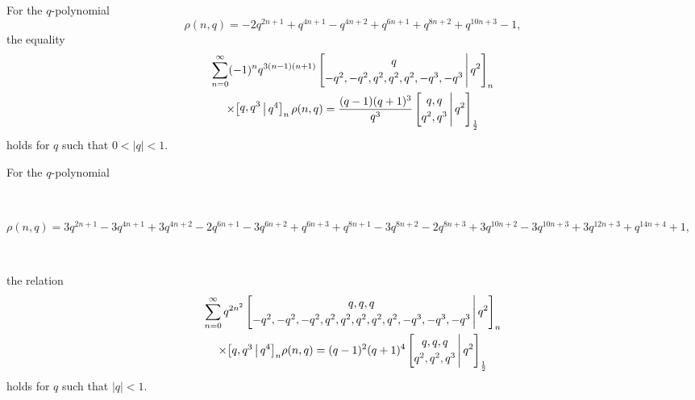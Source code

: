 \documentclass[10pt,a4paper]{amsart}
\begin{document}
\begin{theorem}\label{qnegquarttheorem}
 For the $q$-polynomial 
 $$\rho(n, q) = -2 q^{2 n+1}+q^{4 n+1}-q^{4 n+2}+q^{6 n+1}+q^{8 n+2}+q^{10 n+3}-1,$$ 
\noindent the equality 
\begin{multline*}
 \sum_{n=0}^{\infty} (-1)^n q^{3(n-1) (n+1)} 
 \left[ \begin{matrix} q \vspace{1mm} \\ 
 -q^2, -q^2, q^2, q^2, q^2, -q^3, -q^3 \end{matrix} \, \Bigg| \, q^2 \right]_{n} \\ 
 \times \big[ \begin{matrix} q, q^3 \vspace{1mm} 
 \end{matrix} \, \big| \, q^4 \big]_{n} \, \rho(n, q) = 
 \frac{(q-1) (q+1)^3}{q^3} 
 \left[ \begin{matrix} q, q \vspace{1mm} \\ 
 q^2, q^3 \end{matrix} \, \Bigg| \, q^2 \right]_{\frac{1}{2}} 
\end{multline*}
 holds for $q$ such that $0< |q| < 1$. 
\end{theorem}

\begin{theorem}\label{qGuillerafirst}
 For the $q$-polynomial 

 \ 

\noindent $\rho(n, q) = 
 3 q^{2 n+1}-3 q^{4 n+1}+3 q^{4 n+2}-2 q^{6 n+1}-3 q^{6 n+2}+q^{6 n+3}+q^{8 n+1}-3 q^{8 n+2}-2 q^{8 n+3}+3 q^{10 n+2}-3 q^{10 n+3}+3 q^{12
 n+3}+q^{14 n+4}+1,    $ 

 \ 

\noindent the relation 
\begin{multline*}
 \sum_{n=0}^{\infty} q^{2 n^2} 
 \left[ \begin{matrix} q, q, q \vspace{1mm} \\ 
 -q^2, -q^2, -q^2, q^2, q^2, q^2, q^2, q^2, -q^3, -q^3, -q^3 
 \end{matrix} \, \Bigg| \, q^2 \right]_{n} \\ 
 \times \big[ \begin{matrix} q, q^3 
 \end{matrix} \, \big| \, q^4 \big]_{n} \rho(n, q) = 
 (q-1)^2 (q + 1)^4 
 \left[ \begin{matrix} q, q, q \vspace{1mm} \\ 
 q^2, q^2, q^3 \end{matrix} \, \Bigg| \, q^2 \right]_{\frac{1}{2}} 
\end{multline*}
 holds for $q$ such that $|q| < 1$. 
\end{theorem}
\end{document}
